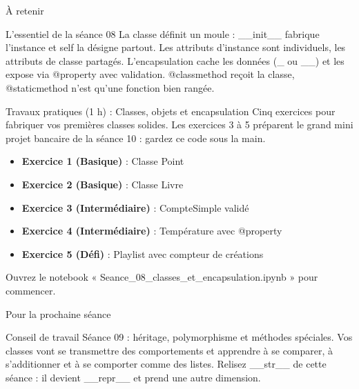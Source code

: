 \documentclass[aspectratio=169,11pt]{beamer}
\begin{document}
\begin{frame}{À retenir}
\begin{block}{L'essentiel de la séance 08}
La classe définit un moule : \_\_init\_\_ fabrique l'instance et self la désigne partout. Les attributs d'instance sont individuels, les attributs de classe partagés. L'encapsulation cache les données (\_ ou \_\_) et les expose via @property avec validation. @classmethod reçoit la classe, @staticmethod n'est qu'une fonction bien rangée.
\end{block}
\end{frame}

\begin{frame}{Travaux pratiques (1 h) : Classes, objets et encapsulation}
Cinq exercices pour fabriquer vos premières classes solides. Les exercices 3 à 5 préparent le grand mini projet bancaire de la séance 10 : gardez ce code sous la main.

\begin{itemize}
  \setlength{\itemsep}{1.5pt}\setlength{\parskip}{0pt}
  \item \textbf{Exercice 1 (Basique)} : Classe Point
  \item \textbf{Exercice 2 (Basique)} : Classe Livre
  \item \textbf{Exercice 3 (Intermédiaire)} : CompteSimple validé
  \item \textbf{Exercice 4 (Intermédiaire)} : Température avec @property
  \item \textbf{Exercice 5 (Défi)} : Playlist avec compteur de créations
\end{itemize}
\vspace{4pt}

{\small\color{PyGris}Ouvrez le notebook « Seance\_08\_classes\_et\_encapsulation.ipynb » pour commencer.}
\end{frame}
\begin{frame}{Pour la prochaine séance}
\begin{exampleblock}{Conseil de travail}
Séance 09 : héritage, polymorphisme et méthodes spéciales. Vos classes vont se transmettre des comportements et apprendre à se comparer, à s'additionner et à se comporter comme des listes. Relisez \_\_str\_\_ de cette séance : il devient \_\_repr\_\_ et prend une autre dimension.
\end{exampleblock}
\end{frame}
\end{document}
